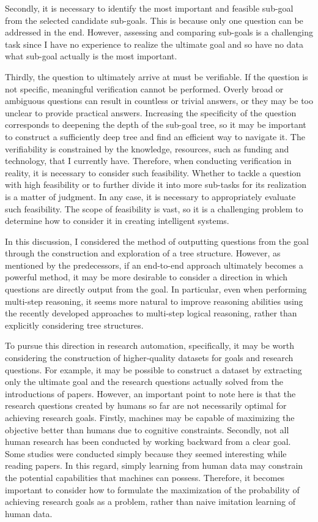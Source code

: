 Secondly, it is necessary to identify the most important and feasible sub-goal from the selected candidate sub-goals. This is because only one question can be addressed in the end. However, assessing and comparing sub-goals is a challenging task since I have no experience to realize the ultimate goal and so have no data what sub-goal actually is the most important.

Thirdly, the question to ultimately arrive at must be verifiable. If the question is not specific, meaningful verification cannot be performed. Overly broad or ambiguous questions can result in countless or trivial answers, or they may be too unclear to provide practical answers. Increasing the specificity of the question corresponds to deepening the depth of the sub-goal tree, so it may be important to construct a sufficiently deep tree and find an efficient way to navigate it. The verifiability is constrained by the knowledge, resources, such as funding and technology, that I currently have. Therefore, when conducting verification in reality, it is necessary to consider such feasibility. Whether to tackle a question with high feasibility or to further divide it into more sub-tasks for its realization is a matter of judgment. In any case, it is necessary to appropriately evaluate such feasibility. The scope of feasibility is vast, so it is a challenging problem to determine how to consider it in creating intelligent systems.

In this discussion, I considered the method of outputting questions from the goal through the construction and exploration of a tree structure. However, as mentioned by the predecessors, if an end-to-end approach ultimately becomes a powerful method, it may be more desirable to consider a direction in which questions are directly output from the goal. In particular, even when performing multi-step reasoning, it seems more natural to improve reasoning abilities using the recently developed approaches to multi-step logical reasoning, rather than explicitly considering tree structures. 

To pursue this direction in research automation, specifically, it may be worth considering the construction of higher-quality datasets for goals and research questions. For example, it may be possible to construct a dataset by extracting only the ultimate goal and the research questions actually solved from the introductions of papers. However, an important point to note here is that the research questions created by humans so far are not necessarily optimal for achieving research goals. Firstly, machines may be capable of maximizing the objective better than humans due to cognitive constraints. Secondly, not all human research has been conducted by working backward from a clear goal. Some studies were conducted simply because they seemed interesting while reading papers. In this regard, simply learning from human data may constrain the potential capabilities that machines can possess. Therefore, it becomes important to consider how to formulate the maximization of the probability of achieving research goals as a problem, rather than naive imitation learning of human data.

